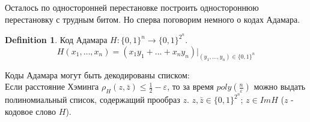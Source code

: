 \documentclass[a4paper]{article}
\theoremstyle{definition}
\newtheorem{definition}{Definition}
\theoremstyle{plain}
\begin{document}
\noindent Осталось по односторонней перестановке построить одностороннюю перестановку с трудным битом. Но сперва поговорим немного о кодах Адамара.

\begin{definition}
	Код Адамара $H\colon \{0, 1\}^n \rightarrow \{0, 1\}^{2^n}$.
	$$
		H(x_1, \ldots, x_n)	= (x_1y_1 + \ldots + x_ny_n)\vert_{(y_1, \ldots, y_n) \in \{0, 1\}^{n}}
	$$
\end{definition}

\noindent Коды Адамара могут быть декодированы списком:~\\
Если расстояние Хэминга $\rho_H(z, \bar{z}) \le \frac{1}{2} - \varepsilon$, то
за время $poly(\frac{n}{\varepsilon})$ можно выдать полиномиальный список, содержащий прообраз $z$.
$z, \bar{z} \in \{0, 1\}^{2^n}$; $z \in Im H$ ($z$ - кодовое слово $H$).~\\
\end{document}
